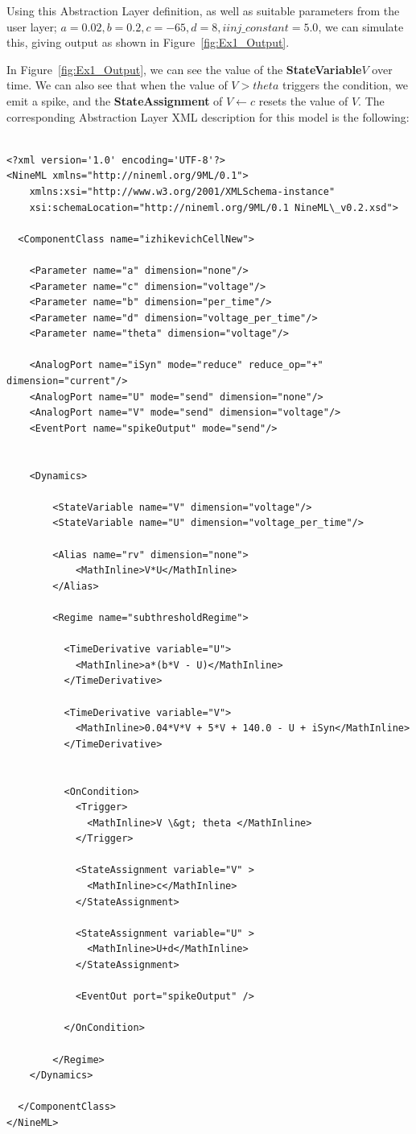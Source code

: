 \documentclass{article}
\newcommand{\StateVariable}{{\bf{StateVariable}}\xspace}
\newcommand{\StateAssignment}{{\bf{StateAssignment}}\xspace}
\begin{document}
\noindent
Using this Abstraction Layer definition, as well as suitable parameters from the
user layer; $a=0.02, b=0.2, c=-65, d= 8, iinj\_constant= 5.0$, we can simulate
this, giving output as shown in Figure~\ref{fig:Ex1_Output}.

In Figure~\ref{fig:Ex1_Output}, we can see the value of the \StateVariable $V$
over time. We can also see that when the value of $V>theta$ triggers the
condition, we emit a spike, and the \StateAssignment of $V \leftarrow c$ resets
the value of $V$.
%
\noindent
The corresponding Abstraction Layer XML description for this model is the following:
%
\begin{lstlisting}

<?xml version='1.0' encoding='UTF-8'?>
<NineML xmlns="http://nineml.org/9ML/0.1">
    xmlns:xsi="http://www.w3.org/2001/XMLSchema-instance"
    xsi:schemaLocation="http://nineml.org/9ML/0.1 NineML\_v0.2.xsd">

  <ComponentClass name="izhikevichCellNew">

    <Parameter name="a" dimension="none"/>
    <Parameter name="c" dimension="voltage"/>
    <Parameter name="b" dimension="per_time"/>
    <Parameter name="d" dimension="voltage_per_time"/>
    <Parameter name="theta" dimension="voltage"/>

    <AnalogPort name="iSyn" mode="reduce" reduce_op="+" dimension="current"/>
    <AnalogPort name="U" mode="send" dimension="none"/>
    <AnalogPort name="V" mode="send" dimension="voltage"/>
    <EventPort name="spikeOutput" mode="send"/>


    <Dynamics>

        <StateVariable name="V" dimension="voltage"/>
        <StateVariable name="U" dimension="voltage_per_time"/>

        <Alias name="rv" dimension="none">
            <MathInline>V*U</MathInline>
        </Alias>

        <Regime name="subthresholdRegime">

          <TimeDerivative variable="U">
            <MathInline>a*(b*V - U)</MathInline>
          </TimeDerivative>

          <TimeDerivative variable="V">
            <MathInline>0.04*V*V + 5*V + 140.0 - U + iSyn</MathInline>
          </TimeDerivative>


          <OnCondition>
            <Trigger>
              <MathInline>V \&gt; theta </MathInline>
            </Trigger>

            <StateAssignment variable="V" >
              <MathInline>c</MathInline>
            </StateAssignment>

            <StateAssignment variable="U" >
              <MathInline>U+d</MathInline>
            </StateAssignment>

            <EventOut port="spikeOutput" />

          </OnCondition>

        </Regime>
    </Dynamics>

  </ComponentClass>
</NineML>
\end{lstlisting}
\end{document}
